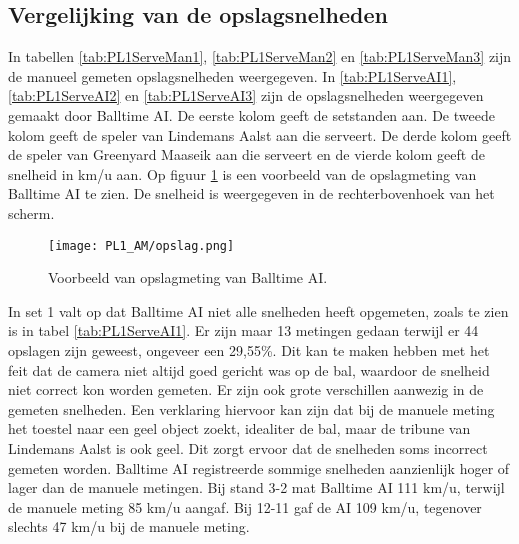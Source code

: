 \subsection{Vergelijking van de opslagsnelheden}
\label{sec:snelheden}

In tabellen \ref{tab:PL1ServeMan1}, \ref{tab:PL1ServeMan2} en \ref{tab:PL1ServeMan3} zijn de manueel gemeten opslagsnelheden weergegeven. In \ref{tab:PL1ServeAI1}, \ref{tab:PL1ServeAI2} en \ref{tab:PL1ServeAI3} zijn  de opslagsnelheden weergegeven gemaakt door Balltime AI. De eerste kolom geeft de setstanden aan. De tweede kolom geeft de speler van Lindemans Aalst aan die serveert. De derde kolom geeft de speler van Greenyard Maaseik aan die serveert en de vierde kolom geeft de snelheid in km/u aan. Op figuur \ref{fig:PL1_Serve} is een voorbeeld van de opslagmeting van Balltime AI te zien. De snelheid is weergegeven in de rechterbovenhoek van het scherm.

\begin{figure}
  \centering
  \texttt{[image: PL1\_AM/opslag.png]}
  \caption{\label{fig:PL1_Serve}Voorbeeld van opslagmeting van Balltime AI.}
\end{figure}

In set 1 valt op dat Balltime AI niet alle snelheden heeft opgemeten, zoals te zien is in tabel \ref{tab:PL1ServeAI1}. Er zijn maar 13 metingen gedaan terwijl er 44 opslagen zijn geweest, ongeveer een 29,55\%. Dit kan te maken hebben met het feit dat de camera niet altijd goed gericht was op de bal, waardoor de snelheid niet correct kon worden gemeten. Er zijn ook grote verschillen aanwezig in de gemeten snelheden. Een verklaring hiervoor kan zijn dat bij de manuele meting het toestel naar een geel object zoekt, idealiter de bal, maar de tribune van Lindemans Aalst is ook geel. Dit zorgt ervoor dat de snelheden soms incorrect gemeten worden. 
Balltime AI registreerde sommige snelheden aanzienlijk hoger of lager dan de manuele metingen. Bij stand 3-2 mat Balltime AI 111 km/u, terwijl de manuele meting 85 km/u aangaf. Bij 12-11 gaf de AI 109 km/u, tegenover slechts 47 km/u bij de manuele meting.

